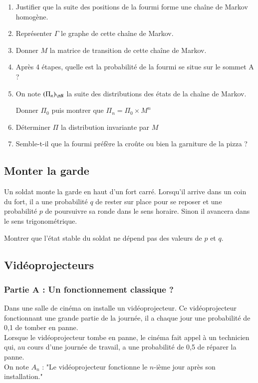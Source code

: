 \documentclass[oneside,12pt]{article}          %
\begin{document}
\begin{enumerate}
    \item Justifier que la suite des positions de la fourmi forme une chaîne de Markov homogène.
    \item Représenter $\Gamma$ le graphe de cette chaîne de Markov.
    \item Donner $M$ la matrice de transition de cette chaîne de Markov.
    \item Après 4 étapes, quelle est la probabilité de la fourmi se situe sur le sommet A ?
    \item On note $(\Pi_n)_{\nN}$ la suite des distributions des états de la chaîne de Markov.

    Donner $\Pi_0$ puis montrer que $\Pi_n=\Pi_0\times M^n$
    \item Déterminer $\Pi$ la distribution invariante par $M$
    \item Semble-t-il que la fourmi préfère la croûte ou bien la garniture de la pizza ?
\end{enumerate}



\subsection{Monter la garde}
Un soldat monte la garde en haut d'un fort carré. Lorsqu'il arrive dans un coin du fort, il a une probabilité $q$ de rester sur place pour se reposer et une probabilité $p$ de poursuivre sa ronde dans le sens horaire. Sinon il avancera dans le sens trigonométrique.

Montrer que l'état stable du soldat ne dépend pas des valeurs de $p$ et $q$.



\subsection{Vidéoprojecteurs}

\subsubsection*{Partie A : Un fonctionnement classique ?}

Dans une salle de cinéma on installe un vidéoprojecteur. Ce vidéoprojecteur fonctionnant une grande partie de la journée, il a chaque jour une probabilité de 0,1 de tomber en panne.\\[5pt]
Lorsque le vidéoprojecteur tombe en panne, le cinéma fait appel à un technicien qui, au cours d'une journée de travail, a une probabilité de 0,5 de réparer la panne.\\[5pt]
On note $A_n$ : "Le vidéoprojecteur fonctionne le $n$-ième jour après son installation."
\end{document}
